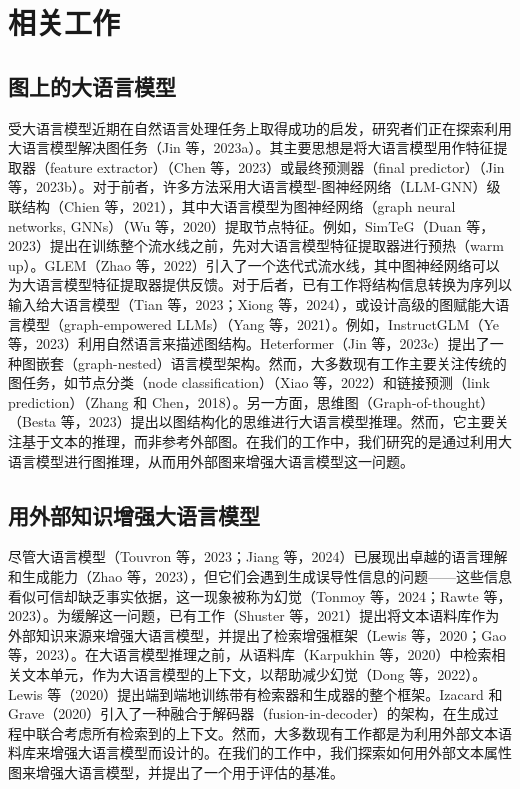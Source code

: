 \documentclass[11pt,UTF8,fontset=fandol]{ctexart}
\begin{document}
\section{相关工作}

\subsection{图上的大语言模型}

受大语言模型近期在自然语言处理任务上取得成功的启发，研究者们正在探索利用大语言模型解决图任务（Jin 等，2023a）。其主要思想是将大语言模型用作特征提取器（feature extractor）（Chen 等，2023）或最终预测器（final predictor）（Jin 等，2023b）。对于前者，许多方法采用大语言模型-图神经网络（LLM-GNN）级联结构（Chien 等，2021），其中大语言模型为图神经网络（graph neural networks, GNNs）（Wu 等，2020）提取节点特征。例如，SimTeG（Duan 等，2023）提出在训练整个流水线之前，先对大语言模型特征提取器进行预热（warm up）。GLEM（Zhao 等，2022）引入了一个迭代式流水线，其中图神经网络可以为大语言模型特征提取器提供反馈。对于后者，已有工作将结构信息转换为序列以输入给大语言模型（Tian 等，2023；Xiong 等，2024），或设计高级的图赋能大语言模型（graph-empowered LLMs）（Yang 等，2021）。例如，InstructGLM（Ye 等，2023）利用自然语言来描述图结构。Heterformer（Jin 等，2023c）提出了一种图嵌套（graph-nested）语言模型架构。然而，大多数现有工作主要关注传统的图任务，如节点分类（node classification）（Xiao 等，2022）和链接预测（link prediction）（Zhang 和 Chen，2018）。另一方面，思维图（Graph-of-thought）（Besta 等，2023）提出以图结构化的思维进行大语言模型推理。然而，它主要关注基于文本的推理，而非参考外部图。在我们的工作中，我们研究的是通过利用大语言模型进行图推理，从而用外部图来增强大语言模型这一问题。

\subsection{用外部知识增强大语言模型}

尽管大语言模型（Touvron 等，2023；Jiang 等，2024）已展现出卓越的语言理解和生成能力（Zhao 等，2023），但它们会遇到生成误导性信息的问题——这些信息看似可信却缺乏事实依据，这一现象被称为幻觉（Tonmoy 等，2024；Rawte 等，2023）。为缓解这一问题，已有工作（Shuster 等，2021）提出将文本语料库作为外部知识来源来增强大语言模型，并提出了检索增强框架（Lewis 等，2020；Gao 等，2023）。在大语言模型推理之前，从语料库（Karpukhin 等，2020）中检索相关文本单元，作为大语言模型的上下文，以帮助减少幻觉（Dong 等，2022）。Lewis 等（2020）提出端到端地训练带有检索器和生成器的整个框架。Izacard 和 Grave（2020）引入了一种融合于解码器（fusion-in-decoder）的架构，在生成过程中联合考虑所有检索到的上下文。然而，大多数现有工作都是为利用外部文本语料库来增强大语言模型而设计的。在我们的工作中，我们探索如何用外部文本属性图来增强大语言模型，并提出了一个用于评估的基准。
\end{document}
